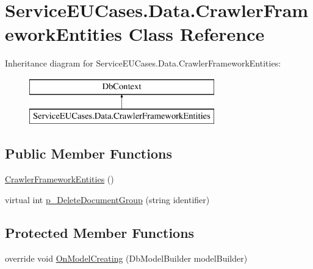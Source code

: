 \hypertarget{class_service_e_u_cases_1_1_data_1_1_crawler_framework_entities}{\section{Service\-E\-U\-Cases.\-Data.\-Crawler\-Framework\-Entities Class Reference}
\label{class_service_e_u_cases_1_1_data_1_1_crawler_framework_entities}
}
Inheritance diagram for Service\-E\-U\-Cases.\-Data.\-Crawler\-Framework\-Entities\-:\begin{figure}[H]
\begin{center}
\leavevmode
\includegraphics[height=2.000000cm]{class_service_e_u_cases_1_1_data_1_1_crawler_framework_entities}
\end{center}
\end{figure}
\subsection*{Public Member Functions}
\begin{DoxyCompactItemize}
\item 
\hyperlink{class_service_e_u_cases_1_1_data_1_1_crawler_framework_entities_a40e65d08d56210ae5349da72c9c2113a}{Crawler\-Framework\-Entities} ()
\item 
virtual int \hyperlink{class_service_e_u_cases_1_1_data_1_1_crawler_framework_entities_ab185daf4e2a0815c70db1f9e4d313ac6}{p\-\_\-\-Delete\-Document\-Group} (string identifier)
\end{DoxyCompactItemize}
\subsection*{Protected Member Functions}
\begin{DoxyCompactItemize}
\item 
override void \hyperlink{class_service_e_u_cases_1_1_data_1_1_crawler_framework_entities_a2aad6b520344af8a1cb7bc67481bee20}{On\-Model\-Creating} (Db\-Model\-Builder model\-Builder)
\end{DoxyCompactItemize}
